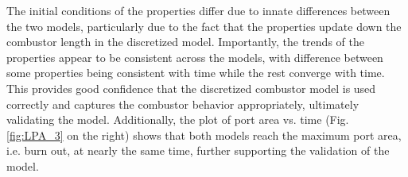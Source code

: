 The initial conditions of the properties differ due to innate differences between the two models, particularly due to the fact that the properties update down the combustor length in the discretized model. Importantly, the trends of the properties appear to be consistent across the models, with difference between some properties being consistent with time while the rest converge with time. This provides good confidence that the discretized combustor model is used correctly and captures the combustor behavior appropriately, ultimately validating the model. Additionally, the plot of port area vs. time (Fig. \ref{fig:LPA_3} on the right) shows that both models reach the maximum port area, i.e. burn out, at nearly the same time, further supporting the validation of the model. 